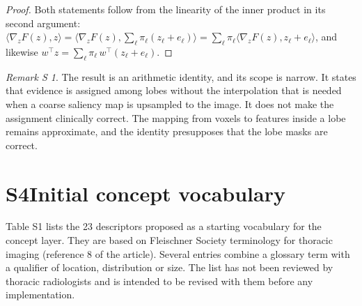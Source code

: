 \documentclass[10pt,a4paper]{article}
\theoremstyle{definition}\newtheorem{definition}{Definition S\!}
\theoremstyle{remark}\newtheorem{remark}{Remark S\!}
\begin{document}
\begin{proof}
Both statements follow from the linearity of the inner product in its second argument:
$\langle\nabla_z F(z),z\rangle=\big\langle\nabla_z F(z),\sum_\ell\pi_\ell(z_\ell+e_\ell)\big\rangle=\sum_\ell\pi_\ell\langle\nabla_z F(z),z_\ell+e_\ell\rangle$, and likewise $w^{\top}z=\sum_\ell\pi_\ell\,w^{\top}(z_\ell+e_\ell)$.
\end{proof}

\begin{remark}
The result is an arithmetic identity, and its scope is narrow. It states that evidence is assigned among lobes without the interpolation that is needed when a coarse saliency map is upsampled to the image. It does not make the assignment clinically correct. The mapping from voxels to features inside a lobe remains approximate, and the identity presupposes that the lobe masks are correct.
\end{remark}

\section*{S4\quad Initial concept vocabulary}

Table S1 lists the 23 descriptors proposed as a starting vocabulary for the concept layer. They are based on Fleischner Society terminology for thoracic imaging (reference 8 of the article). Several entries combine a glossary term with a qualifier of location, distribution or size. The list has not been reviewed by thoracic radiologists and is intended to be revised with them before any implementation.
\end{document}
